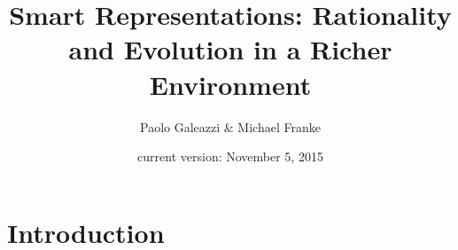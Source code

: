 \documentclass[fleqn,reqno,11pt]{article}
\title{Smart Representations: {R}ationality and Evolution in a Richer  Environment}
\author{Paolo Galeazzi \& Michael Franke} \date{current version: November 5, 2015}
\newcommand{\myalert}[1]{\textcolor{red}{#1}}
\begin{document}




\maketitle

\section{Introduction}
\label{sec:intr--motiv}
\end{document}
